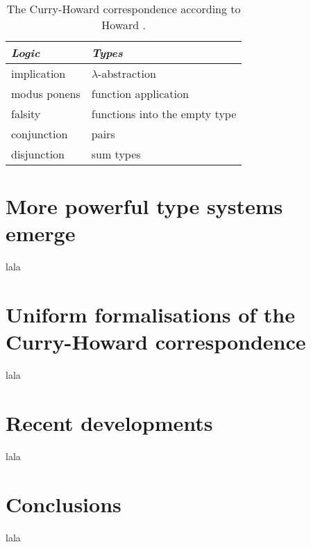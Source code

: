 \documentclass[12pt,toc=bibliography,numbers=noendperiod,
               footnotes=multiple,twoside]{scrartcl}
\begin{document}
\begin{table}[h]
    \centering
    \begin{tabular}{l l}
        \toprule
        \textit{Logic} & \textit{Types} \\
        \midrule
	implication & \(\lambda\)-abstraction \\
	modus ponens & function application \\
	falsity & functions into the empty type \\
	conjunction & pairs \\
	disjunction & sum types \\
        \bottomrule
    \end{tabular}
    \caption{The Curry-Howard correspondence according to Howard \autocite{howard_formulae_as-types_1980}.}
    \label{tab:howard}
\end{table}

\section{More powerful type systems emerge}
lala

\section{Uniform formalisations of the Curry-Howard correspondence}
lala

\section{Recent developments}
lala

\section{Conclusions}
lala

\printbibliography
\end{document}
